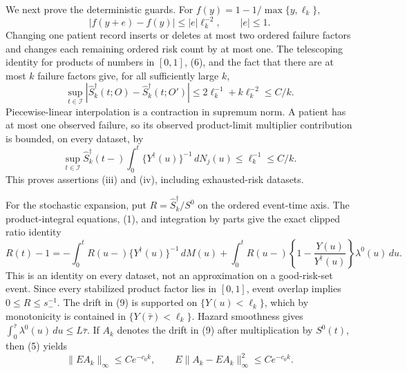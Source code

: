 We next prove the deterministic guards.  For
\(f(y)=1-1/\max\{y,\ell_k\}\),
\[
 |f(y+e)-f(y)|\leq |e|\ell_k^{-2},
 \qquad |e|\leq1.                                       \tag{6}
\]
Changing one patient record inserts or deletes at most two ordered failure
factors and changes each remaining ordered risk count by at most one.  The
telescoping identity for products of numbers in \([0,1]\), (6), and the fact
that there are at most \(k\) failure factors give, for all sufficiently large
\(k\),
\[
 \sup_{t\in\mathcal I}
 |\widehat S_k^\dagger(t;O)-\widehat S_k^\dagger(t;O')|
 \leq 2\ell_k^{-1}+k\ell_k^{-2}\leq C/k.                \tag{7}
\]
Piecewise-linear interpolation is a contraction in supremum norm.  A patient
has at most one observed failure, so its observed product-limit multiplier
contribution is bounded, on every dataset, by
\[
 \sup_{t\in\mathcal I}\widehat S_k^\dagger(t-)
 \int_0^t\{Y^\dagger(u)\}^{-1}\,dN_j(u)
 \leq\ell_k^{-1}\leq C/k.                               \tag{8}
\]
This proves assertions (iii) and (iv), including exhausted-risk datasets.

For the stochastic expansion, put \(R=\widehat S_k^\dagger/S^0\) on the
ordered event-time axis.  The product-integral equations, (1), and integration
by parts give the exact clipped ratio identity
\[
 R(t)-1
 =-\int_0^tR(u-)\{Y^\dagger(u)\}^{-1}\,dM(u)
  +\int_0^tR(u-)\left\{1-\frac{Y(u)}{Y^\dagger(u)}\right\}
             \lambda^0(u)\,du.                           \tag{9}
\]
This is an identity on every dataset, not an approximation on a good-risk-set
event.  Since every stabilized product factor lies in \([0,1]\), event overlap
implies \(0\leq R\leq s_-^{-1}\).  The drift in (9) is supported on
\(\{Y(u)<\ell_k\}\), which by monotonicity is contained in
\(\{Y(\bar\tau)<\ell_k\}\).  Hazard smoothness gives
\(\int_0^{\bar\tau}\lambda^0(u)\,du\leq L\bar\tau\).
If \(A_k\) denotes the drift in (9) after multiplication by \(S^0(t)\),
then (5) yields
\[
 \|EA_k\|_\infty\leq Ce^{-c_0k},
 \qquad
 E\|A_k-EA_k\|_\infty^2\leq Ce^{-c_0k}.                \tag{10}
\]

